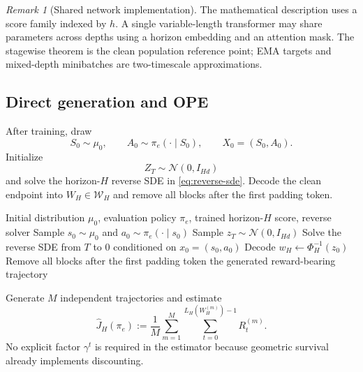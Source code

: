 \documentclass[11pt]{article}
\theoremstyle{definition}
\theoremstyle{remark}
\newtheorem{remark}[theorem]{Remark}
\newcommand{\Wspace}{\mathcal W}
\newcommand{\Normal}{\mathcal N}
\newcommand{\targetpi}{\pi_e}
\begin{document}
\begin{remark}[Shared network implementation]
The mathematical description uses a score family indexed by $h$. A single
variable-length transformer may share parameters across depths using a horizon
embedding and an attention mask. The stagewise theorem is the clean population
reference point; EMA targets and mixed-depth minibatches are two-timescale
approximations.
\end{remark}

\subsection{Direct generation and OPE}

After training, draw
\begin{equation}
S_0\sim\mu_0,
\qquad
A_0\sim\targetpi(\cdot\mid S_0),
\qquad
X_0=(S_0,A_0).
\end{equation}
Initialize
\begin{equation}
Z_T\sim\Normal(0,I_{Hd})
\end{equation}
and solve the horizon-$H$ reverse SDE in \cref{eq:reverse-sde}. Decode the
clean endpoint into $W_H\in\Wspace_H$ and remove all blocks after the first
padding token.

\begin{algorithm}[H]
\caption{Direct Evaluation-Policy Trajectory Generation}
\label{alg:generation}
\begin{algorithmic}[1]
\Require Initial distribution $\mu_0$, evaluation policy $\targetpi$,
trained horizon-$H$ score, reverse solver
\State Sample $s_0\sim\mu_0$ and $a_0\sim\targetpi(\cdot\mid s_0)$
\State Sample $z_T\sim\Normal(0,I_{Hd})$
\State Solve the reverse SDE from $T$ to $0$ conditioned on
$x_0=(s_0,a_0)$
\State Decode $w_H\gets\Phi_H^{-1}(z_0)$
\State Remove all blocks after the first padding token
\State \Return the generated reward-bearing trajectory
\end{algorithmic}
\end{algorithm}

Generate $M$ independent trajectories and estimate
\begin{equation}
\boxed{
\widehat J_H(\targetpi)
:=
\frac{1}{M}
\sum_{m=1}^M
\sum_{t=0}^{L_H(W_H^{(m)})-1}
R_t^{(m)}.
}
\label{eq:ope-estimator}
\end{equation}
No explicit factor $\gamma^t$ is required in the estimator because geometric
survival already implements discounting.
\end{document}
